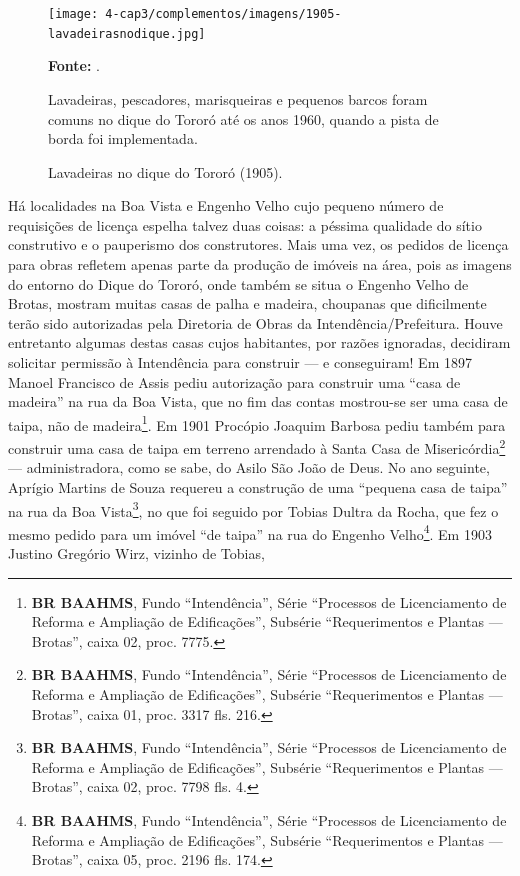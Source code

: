 \begin{figure}[!h]
\centering
\caption{Lavadeiras no dique do Tororó (1905).}
\texttt{[image: 4-cap3/complementos/imagens/1905-lavadeirasnodique.jpg]}{\footnotesize \par \textbf{Fonte:} . \par Lavadeiras, pescadores, marisqueiras e pequenos barcos foram comuns no dique do Tororó até os anos 1960, quando a pista de borda foi implementada.}
\label{fig:1905-lavadeirasnodique}
\end{figure}


Há localidades na Boa Vista e Engenho Velho cujo pequeno número de requisições de licença espelha talvez duas coisas: a péssima qualidade do sítio construtivo e o pauperismo dos construtores. Mais uma vez, os pedidos de licença para obras refletem apenas parte da produção de imóveis na área, pois as imagens do entorno do Dique do Tororó, onde também se situa o Engenho Velho de Brotas, mostram muitas casas de palha e madeira, choupanas que dificilmente terão sido autorizadas pela Diretoria de Obras da Intendência/Prefeitura. Houve entretanto algumas destas casas cujos habitantes, por razões ignoradas, decidiram solicitar permissão à Intendência para construir --- e conseguiram! Em 1897 Manoel Francisco de Assis pediu autorização para construir uma ``casa de madeira'' na rua da Boa Vista, que no fim das contas mostrou-se ser uma casa de taipa, não de madeira\footnote{\textbf{BR BAAHMS}, Fundo ``Intendência'', Série ``Processos de Licenciamento de Reforma e Ampliação de Edificações'', Subsérie ``Requerimentos e Plantas --- Brotas'', caixa 02, proc. 7775.}. Em 1901 Procópio Joaquim Barbosa pediu também para construir uma casa de taipa em terreno arrendado à Santa Casa de Misericórdia\footnote{\textbf{BR BAAHMS}, Fundo ``Intendência'', Série ``Processos de Licenciamento de Reforma e Ampliação de Edificações'', Subsérie ``Requerimentos e Plantas --- Brotas'', caixa 01, proc. 3317 fls. 216.} --- administradora, como se sabe, do Asilo São João de Deus. No ano seguinte, Aprígio Martins de Souza requereu a construção de uma ``pequena casa de taipa'' na rua da Boa Vista\footnote{\textbf{BR BAAHMS}, Fundo ``Intendência'', Série ``Processos de Licenciamento de Reforma e Ampliação de Edificações'', Subsérie ``Requerimentos e Plantas --- Brotas'', caixa 02, proc. 7798 fls. 4.}, no que foi seguido por Tobias Dultra da Rocha, que fez o mesmo pedido para um imóvel ``de taipa'' na rua do Engenho Velho\footnote{\textbf{BR BAAHMS}, Fundo ``Intendência'', Série ``Processos de Licenciamento de Reforma e Ampliação de Edificações'', Subsérie ``Requerimentos e Plantas --- Brotas'', caixa 05, proc. 2196 fls. 174.}. Em 1903 Justino Gregório Wirz, vizinho de Tobias, 